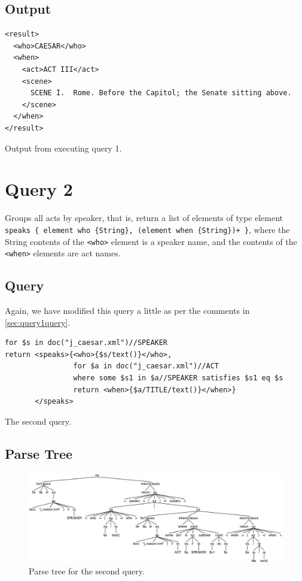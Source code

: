 \documentclass{article}
\begin{document}
\subsection{Output}
\begin{listing}[H]
\begin{verbatim}
<result>
  <who>CAESAR</who>
  <when>
    <act>ACT III</act>
    <scene>
      SCENE I.  Rome. Before the Capitol; the Senate sitting above.
    </scene>
  </when>
</result>
\end{verbatim}
\caption{Output from executing query 1.}\label{lst:res1}
\end{listing}

\section{Query 2}
Groups all acts by speaker, that is, return a list of elements of type element  \texttt{speaks \{ element who \{String\}, (element when \{String\})+ \}}, where the String contents of the \texttt{<who>} element is a speaker name, and the contents of the \texttt{<when>} elements are act names.

\subsection{Query}
Again, we have modified this query a little as per the comments in \cref{sec:query1query}.

\begin{listing}[H]
\begin{verbatim}
for $s in doc("j_caesar.xml")//SPEAKER
return <speaks>{<who>{$s/text()}</who>,
                for $a in doc("j_caesar.xml")//ACT
                where some $s1 in $a//SPEAKER satisfies $s1 eq $s
                return <when>{$a/TITLE/text()}</when>}
       </speaks>
\end{verbatim}
\caption{The second query.}\label{lst:query2}
\end{listing}

\subsection{Parse Tree}
\begin{figure}[H]
  \centering
  \includegraphics[width=\linewidth]{imgs/antlr4_parse_tree_query_2.png}
  \caption{Parse tree for the second query.}\label{fig:parseTree2}
\end{figure}
\end{document}
